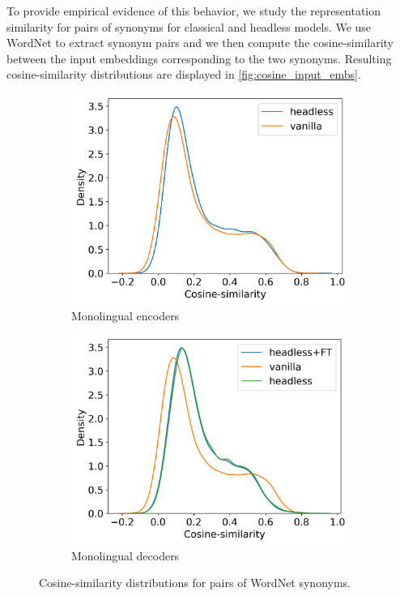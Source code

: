 To provide empirical evidence of this behavior, we study the representation similarity for pairs of synonyms for classical and headless models. 
We use WordNet \citep{Fellbaum1998} to extract synonym pairs and we then compute the cosine-similarity between the input embeddings corresponding to the two synonyms.
Resulting cosine-similarity distributions are displayed in \autoref{fig:cosine_input_embs}.

\begin{figure}[H]
    \centering
    \begin{subfigure}[b]{0.48\columnwidth}
         \includegraphics[width=\linewidth]{sources/part_2/headless/imgs/input_embs_cosines_bert.png}
         \caption{Monolingual encoders}
         \label{fig:input_embs_cosines_bert}
    \end{subfigure}
    \begin{subfigure}[b]{0.48\columnwidth}
         \includegraphics[width=\linewidth]{sources/part_2/headless/imgs/input_embs_cosines_pythia.png}
         \caption{Monolingual decoders}
         \label{fig:input_embs_cosines_pythia}
    \end{subfigure}
    \caption{Cosine-similarity distributions for pairs of WordNet synonyms.}
    \label{fig:cosine_input_embs}
\end{figure}

